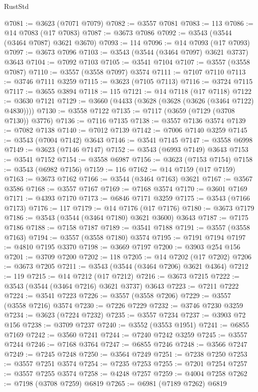 \begin{lexlean}{RustStd}
\begin{coremodule}
@7081 := @3623 (@7071 @7079)
@7082 := @3557 @7081
@7083 := 113
@7086 := @14 @7083 (@17 @7083)
@7087 := @3673 @7086
@7092 := @3543 (@3544 (@3464 @7087) @3621 @3670)
@7093 := 114
@7096 := @14 @7093 (@17 @7093)
@7097 := @3673 @7096
@7103 := @3543 (@3544 (@3464 @7097) @3621 @3737) @3643
@7104 := @7092 @7103
@7105 := @3541 @7104
@7107 := @3557 (@3558 @7087)
@7110 := @3557 (@3558 @7097) @3574
@7111 := @7107 @7110
@7113 := @3746 @7111 @3259
@7115 := @3623 (@7105 @7113)
@7116 := @3724 @7115
@7117 := @3655 @3894
@7118 := 115
@7121 := @14 @7118 (@17 @7118)
@7122 := @3630 @7121
@7129 := @3660 (@4433 (@3628 (@3628 (@3626 (@3464 @7122) @4830))))
@7130 := @3558 @7122
@7135 := @7117 (@3659 (@7129 (@3708 @7130)) @3776)
@7136 := @7116 @7135
@7138 := @3557 @7136 @3574
@7139 := @7082 @7138
@7140 := @7012 @7139
@7142 := @7006 @7140 @3259
@7145 := @3543 (@7004 @7142) @3643
@7146 := @3541 @7145
@7147 := @3558 @6998
@7149 := @3623 (@7146 @7147)
@7152 := @3543 (@6993 @7149) @3643
@7153 := @3541 @7152
@7154 := @3558 @6987
@7156 := @3623 (@7153 @7154)
@7158 := @3543 (@6982 @7156)
@7159 := 116
@7162 := @14 @7159 (@17 @7159)
@7163 := @3673 @7162
@7166 := @3544 (@3464 @7163) @3621
@7167 := @3567 @3586
@7168 := @3557 @7167
@7169 := @7168 @3574
@7170 := @3601 @7169
@7171 := @4393 @7170
@7173 := @6846 @7171 @3259
@7175 := @3543 (@7166 @7173)
@7176 := 117
@7179 := @14 @7176 (@17 @7176)
@7180 := @3673 @7179
@7186 := @3543 (@3544 (@3464 @7180) @3621 @3600) @3643
@7187 := @7175 @7186
@7188 := @7158 @7187
@7189 := @3541 @7188
@7191 := @3557 (@3558 @7163)
@7194 := @3557 (@3558 @7180) @3574
@7195 := @7191 @7194
@7197 := @4810 @7195 @3370
@7198 := @3669 @7197
@7200 := @3903 @254 @156
@7201 := @3709 @7200
@7202 := 118
@7205 := @14 @7202 (@17 @7202)
@7206 := @3673 @7205
@7211 := @3543 (@3544 (@3464 @7206) @3621 @4364)
@7212 := 119
@7215 := @14 @7212 (@17 @7212)
@7216 := @3673 @7215
@7222 := @3543 (@3544 (@3464 @7216) @3621 @3737) @3643
@7223 := @7211 @7222
@7224 := @3541 @7223
@7226 := @3557 (@3558 @7206)
@7229 := @3557 (@3558 @7216) @3574
@7230 := @7226 @7229
@7232 := @3746 @7230 @3259
@7234 := @3623 (@7224 @7232)
@7235 := @3557 @7234
@7237 := @3903 @72 @156
@7238 := @3709 @7237
@7240 := @3552 (@3553 @1951)
@7241 := @6855 @7169
@7242 := @3560 @7241
@7244 := @7240 @7242 @3259
@7245 := @3557 @7244
@7246 := @7168 @3764
@7247 := @6855 @7246
@7248 := @3566 @7247
@7249 := @7245 @7248
@7250 := @3564 @7249
@7251 := @7238 @7250
@7253 := @3557 @7251 @3574
@7254 := @7235 @7253
@7255 := @7201 @7254
@7257 := @3557 @7255 @3574
@7258 := @4248 @7257
@7259 := @4004 @7258
@7262 := @7198 (@3708 @7259) @6819
@7265 := @6981 (@7189 @7262) @6819

\end{coremodule}
\end{lexlean}
